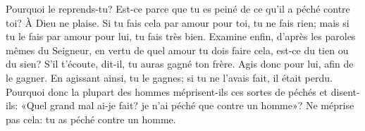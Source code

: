 Pourquoi le reprends-tu?
	Est-ce parce que tu es peiné de ce qu’il a péché contre toi?
	À Dieu ne plaise.
Si tu fais cela par amour pour toi, tu ne fais rien;
	mais si tu le fais par amour pour lui, tu fais très bien.
Examine enfin, d’après les paroles mêmes du Seigneur,
	en vertu de quel amour tu dois faire cela, est-ce du tien ou du sien?
S’il t’écoute, dit-il, tu auras gagné ton frère.
	Agis donc pour lui, afin de le gagner.
En agissant ainsi, tu le gagnes;
	si tu ne l’avais fait, il était perdu.
Pourquoi donc la plupart des hommes méprisent-ils ces sortes de péchés
	et disent-ils: «Quel grand mal ai-je fait?
	je n’ai péché que contre un homme»?
Ne méprise pas cela: tu as péché contre un homme.
